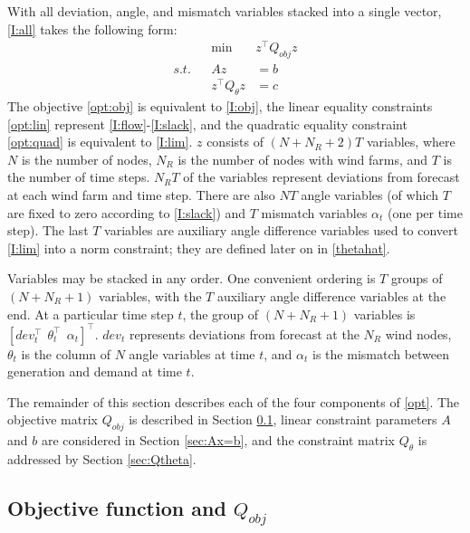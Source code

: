 \documentclass[conference]{IEEEtran}
\begin{document}
With all deviation, angle, and mismatch variables stacked into a single vector, \eqref{I:all} takes the following form:
\begin{subequations}\label{opt}
\begin{align}
\label{opt:obj}  &&  \min~ & z^\top Q_{obj} z \\
\label{opt:lin}  s.t. && Az &= b  \\
\label{opt:quad} &&  z^\top Q_{\theta}z &= c 
\end{align}
\end{subequations}
The objective \eqref{opt:obj} is equivalent to \eqref{I:obj}, the linear equality constraints \eqref{opt:lin} represent \eqref{I:flow}-\eqref{I:slack}, and the quadratic equality constraint \eqref{opt:quad} is equivalent to \eqref{I:lim}. $z$ consists of $(N+N_R+2)T$ variables, where $N$ is the number of nodes, $N_R$ is the number of nodes with wind farms, and $T$ is the number of time steps. $N_RT$ of the variables represent deviations from forecast at each wind farm and time step. There are also $NT$ angle variables (of which $T$ are fixed to zero according to \eqref{I:slack}) and $T$ mismatch variables $\alpha_t$ (one per time step). The last $T$ variables are auxiliary angle difference variables used to convert \eqref{I:lim} into a norm constraint; they are defined later on in \eqref{thetahat}.

Variables may be stacked in any order. One convenient ordering is $T$ groups of $(N+N_R+1)$ variables, with the $T$ auxiliary angle difference variables at the end. At a particular time step $t$, the group of $(N+N_R+1)$ variables is $[dev_t^\top ~~ \theta_t^\top ~~ \alpha_t ]^\top$. $dev_t$ represents deviations from forecast at the $N_R$ wind nodes, $\theta_t$ is the column of $N$ angle variables at time $t$, and $\alpha_t$ is the mismatch between generation and demand at time $t$.

The remainder of this section describes each of the four components of \eqref{opt}. The objective matrix $Q_{obj}$ is described in Section \ref{sec:Qobj}, linear constraint parameters $A$ and $b$ are considered in Section \ref{sec:Ax=b}, and the constraint matrix $Q_{\theta}$ is addressed by Section \ref{sec:Qtheta}.

\subsection{Objective function and $Q_{obj}$}\label{sec:Qobj}
\end{document}

